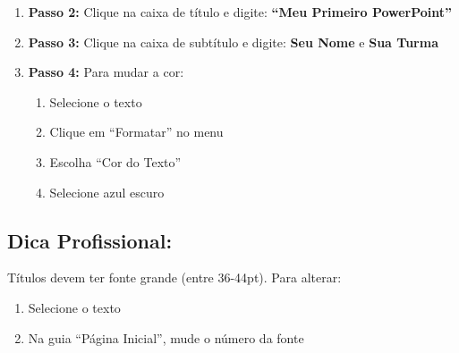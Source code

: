 \documentclass[11pt]{article}
\begin{document}
\begin{multicols}{2}
\begin{enumerate}
\item \textbf{Passo 2:} Clique na caixa de título e digite: \textbf{``Meu Primeiro PowerPoint''}

\item \textbf{Passo 3:} Clique na caixa de subtítulo e digite: \textbf{Seu Nome} e \textbf{Sua Turma}

\item \textbf{Passo 4:} Para mudar a cor:
\begin{enumerate}
\item Selecione o texto
\item Clique em ``Formatar'' no menu
\item Escolha ``Cor do Texto''
\item Selecione azul escuro
\end{enumerate}
\end{enumerate}

\subsection*{Dica Profissional:}
Títulos devem ter fonte grande (entre 36-44pt). Para alterar:
\begin{enumerate}
\item Selecione o texto
\item Na guia ``Página Inicial'', mude o número da fonte
\end{enumerate}

\end{multicols}
\end{document}
